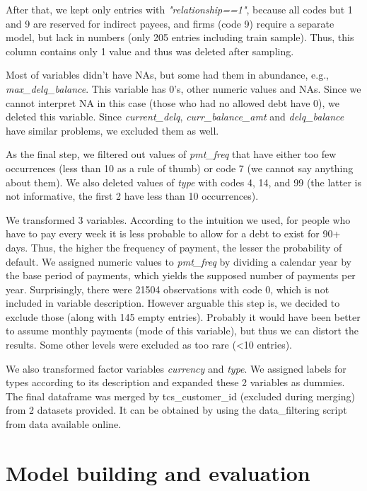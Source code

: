 \documentclass[12pt,a4paper]{article}
\begin{document}
After that, we kept only entries with \textit{"relationship==1"}, because all codes but 1 and 9 are reserved for indirect payees, and firms (code 9) require a separate model, but lack in numbers (only 205 entries including train sample). Thus, this column contains only 1 value and thus was deleted after sampling.

Most of variables didn't have NAs, but some had them in abundance, e.g., \textit{max\_delq\_balance}. This variable has 0's, other numeric values and NAs. Since we cannot interpret NA in this case (those who had no allowed debt have 0), we deleted this variable. Since \textit{current\_delq}, \textit{curr\_balance\_amt} and \textit{delq\_balance} have similar problems, we excluded them as well.

As the final step, we filtered out values of \textit{pmt\_freq} that have either too few occurrences (less than 10 as a rule of thumb) or code 7 (we cannot say anything about them). We also deleted values of \textit{type} with codes 4, 14, and 99 (the latter is not informative, the first 2 have less than 10 occurrences). 

We transformed 3 variables. According to the intuition we used, for people who have to pay every week it is less probable to allow for a debt to exist for 90+ days. Thus, the higher the frequency of payment, the lesser the probability of default. We assigned numeric values to \textit{pmt\_freq} by dividing a calendar year by the base period of payments, which yields the supposed number of payments per year. Surprisingly, there were 21504 observations with code 0, which is not included in variable description. However arguable this step is, we decided to exclude those (along with 145 empty entries). Probably it would have been better to assume monthly payments (mode of this variable), but thus we can distort the results. Some other levels were excluded as too rare (<10 entries).

We also transformed factor variables \textit{currency} and \textit{type}. We assigned labels for types according to its description and expanded these 2 variables as dummies. The final dataframe was merged by tcs\_customer\_id (excluded during merging) from 2 datasets provided. It can be obtained by using the data\_filtering script from data available online.

\section{Model building and evaluation}
\end{document}
